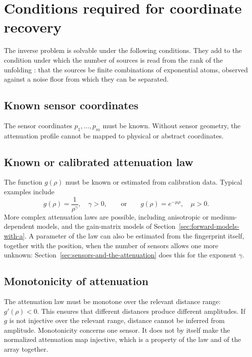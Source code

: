 \documentclass{article}
\begin{document}
\section{Conditions required for coordinate recovery}\label{sec:conditions-required-for-coordinate}

The inverse problem is solvable under the following conditions. They add to the condition under which the number of sources is read from the rank of the unfolding \cite{ref-BernadotteBuchstaber, ref-Bernadotte05}: that the sources be finite combinations of exponential atoms, observed against a noise floor from which they can be separated.

\subsection{Known sensor coordinates}\label{sec:known-sensor-coordinates}

The sensor coordinates $p_1, \dots, p_m$ must be known. Without sensor geometry, the attenuation profile cannot be mapped to physical or abstract coordinates.

\subsection{Known or calibrated attenuation law}\label{sec:known-or-calibrated-attenuation}

The function $g(\rho)$ must be known or estimated from calibration data. Typical examples include \[
g(\rho) = \frac{1}{\rho^{\gamma}}, \quad \gamma > 0, \qquad \text{or} \qquad g(\rho) = e^{-\mu\rho}, \quad \mu > 0 .
\] More complex attenuation laws are possible, including anisotropic or medium-dependent models, and the gain-matrix models of Section~\ref{sec:forward-models-with-a}. A parameter of the law can also be estimated from the fingerprint itself, together with the position, when the number of sensors allows one more unknown: Section~\ref{sec:sensors-and-the-attenuation} does this for the exponent $\gamma$.

\subsection{Monotonicity of attenuation}\label{sec:monotonicity-of-attenuation}

The attenuation law must be monotone over the relevant distance range: $g'(\rho) < 0$. This ensures that different distances produce different amplitudes. If $g$ is not injective over the relevant range, distance cannot be inferred from amplitude. Monotonicity concerns one sensor. It does not by itself make the normalized attenuation map injective, which is a property of the law and of the array together.
\end{document}
